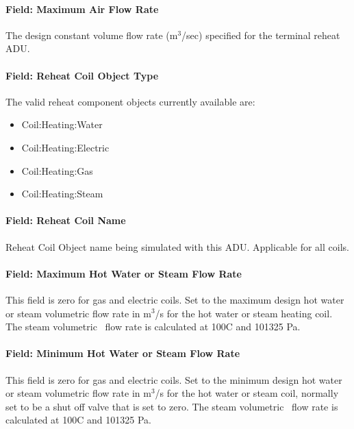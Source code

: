 \paragraph{Field: Maximum Air Flow Rate}\label{field-maximum-air-flow-rate-1}

The design constant volume flow rate (m\(^{3}\)/sec) specified for the terminal reheat ADU.

\paragraph{Field: Reheat Coil Object Type}\label{field-reheat-coil-object-type}

The valid reheat component objects currently available are:

\begin{itemize}
\item
  Coil:Heating:Water
\item
  Coil:Heating:Electric
\item
  Coil:Heating:Gas
\item
  Coil:Heating:Steam
\end{itemize}

\paragraph{Field: Reheat Coil Name}\label{field-reheat-coil-name}

Reheat Coil Object name being simulated with this ADU. Applicable for all coils.

\paragraph{Field: Maximum Hot Water or Steam Flow Rate}\label{field-maximum-hot-water-or-steam-flow-rate}

This field is zero for gas and electric coils. Set to the maximum design hot water or steam volumetric flow rate in m\(^{3}\)/s for the hot water or steam heating coil. The steam volumetric~ flow rate is calculated at 100C and 101325 Pa.

\paragraph{Field: Minimum Hot Water or Steam Flow Rate}\label{field-minimum-hot-water-or-steam-flow-rate}

This field is zero for gas and electric coils. Set to the minimum design hot water or steam volumetric flow rate in m\(^{3}\)/s for the hot water or steam coil, normally set to be a shut off valve that is set to zero. The steam volumetric~ flow rate is calculated at 100C and 101325 Pa.

